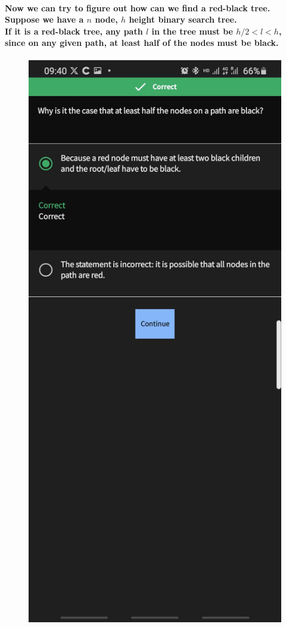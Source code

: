 \documentclass{article}
\begin{document}
\paragraph{
    Now we can try to figure out how can we find a red-black tree.\\
    Suppose we have a $n$ node, $h$ height binary search tree.\\
    If it is a red-black tree, any path $l$ in the tree must be $h/2 < l < h$, since on any given path,
    at least half of the nodes must be black.\\
}

\begin{figure}[H]
    \includegraphics[width=\textwidth]{halfofthepathareblack.jpg}
\end{figure}
\end{document}

